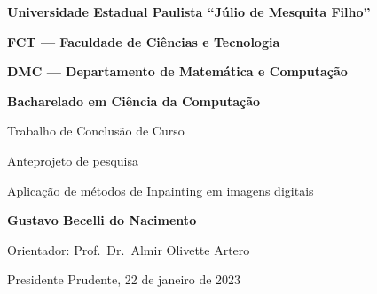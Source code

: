 \pagestyle{empty}
\begin{center}
\bf{Universidade Estadual Paulista ``Júlio de Mesquita Filho''}
  
  \bf{FCT — Faculdade de Ciências e Tecnologia}
  
  \bf{DMC — Departamento de Matemática e Computação}
  
  \bf{Bacharelado em Ciência da Computação}
  
  \vspace*{\fill}
  \vspace{42pt}
  \Large{	\textmd{Trabalho de Conclusão de Curso}}
    
  \large{Anteprojeto de pesquisa}
  
  \vspace{42pt}
  \Large{Aplicação de métodos de Inpainting em imagens digitais}
  
  \vspace{42pt}
  \normalsize{\bf{Gustavo Becelli do Nacimento}
  
  \vspace{12pt}
  Orientador: \textmd{Prof.\ Dr.\ Almir Olivette Artero}}
  
  \vspace*{\fill}
  \vspace{12pt}
  Presidente Prudente, 22 de janeiro de 2023
\end{center}